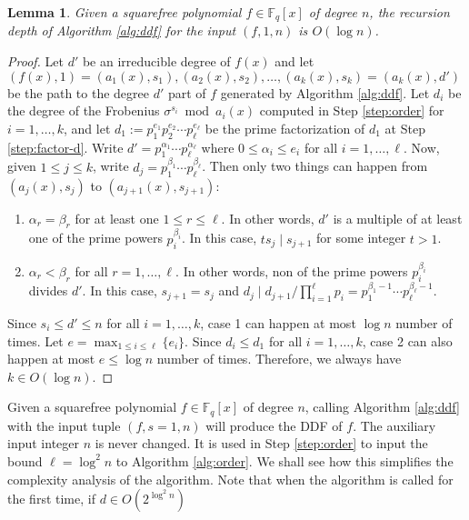 \documentclass{article}
\theoremstyle{plain}
\newtheorem{lemma}[theorem]{Lemma}
\theoremstyle{definition}
\def\F{\ensuremath{\mathbb{F}}}
\begin{document}
\begin{lemma}
	\label{lem:depth}
	Given a squarefree polynomial $f \in \F_q[x]$ of degree $n$, the recursion depth of Algorithm 
	\ref{alg:ddf} for the input $(f, 1, n)$ is $O(\log n)$.
\end{lemma}
\begin{proof}
	Let $d'$ be an irreducible degree of $f(x)$ and let $(f(x), 1) = (a_1(x), s_1), (a_2(x), s_2), 
	\dots, (a_k(x), s_k) = (a_k(x), d')$ be the path to the degree $d'$ part of $f$ generated by 
	Algorithm \ref{alg:ddf}. Let $d_i$ be the degree of the Frobenius $\sigma^{s_i} \bmod a_i(x)$ 
	computed in Step \ref{step:order} for $i = 1, \dots, k$, and let $d_1 := p_1^{e_1} p_2^{e_2} 
	\cdots p_\ell^{e_\ell}$ be the prime factorization of $d_1$ at Step \ref{step:factor-d}. Write 
	$d' = p_1^{\alpha_1} \cdots p_\ell^{\alpha_\ell}$ where $0 \le \alpha_i \le e_i$ for all $i 
	= 1, \dots, \ell$. Now, given $1 \le j \le k$, write $d_j = p_1^{\beta_1} \cdots 
	p_\ell^{\beta_\ell}$. Then only two things can happen from $(a_j(x), s_j)$ to $(a_{j + 1}(x), 
	s_{j + 1})$:
	\begin{enumerate}
		\item $\alpha_r = \beta_r$ for at least one $1 \le r \le \ell$. In other words, $d'$ is a 
		multiple of at least one of the prime powers $p_i^{\beta_i}$. In this case, $ts_j \mid s_{j 
		+ 1}$ for some integer $t > 1$.
		\item $\alpha_r < \beta_r$ for all $r = 1, \dots, \ell$. In other words, non of the prime 
		powers $p_i^{\beta_i}$ divides $d'$. In this case, $s_{j + 1} = s_j$ and $d_j \mid d_{j + 
		1} / \prod_{i = 1}^\ell p_i = p_1^{\beta_1 - 1} \cdots p_\ell^{\beta_\ell - 1}$.
	\end{enumerate}
	Since $s_i \le d' \le n$ for all $i = 1, \dots, k$, case 1 can happen at most $\log n$ 
	number of times. Let $e = \max_{1 \le i \le \ell}\{ e_i \}$. Since $d_i \le d_1$ for all $i = 
	1, \dots, k$, case 2 can also happen at most $e \le \log n$ number of times. Therefore, we 
	always have $k \in O(\log n)$.
\end{proof}
Given a squarefree polynomial $f \in \F_q[x]$ of degree $n$, calling Algorithm \ref{alg:ddf} with 
the input tuple $(f, s = 1, n)$ will produce the DDF of $f$. The auxiliary input integer $n$ is 
never changed. It is used in Step \ref{step:order} to input the bound $\ell = \log^2n$ to 
Algorithm \ref{alg:order}. We shall see how this simplifies the complexity analysis of the 
algorithm. Note that when the algorithm is called for the first time, if $d \in O(2^{\log^2n})$ 
\end{document}
